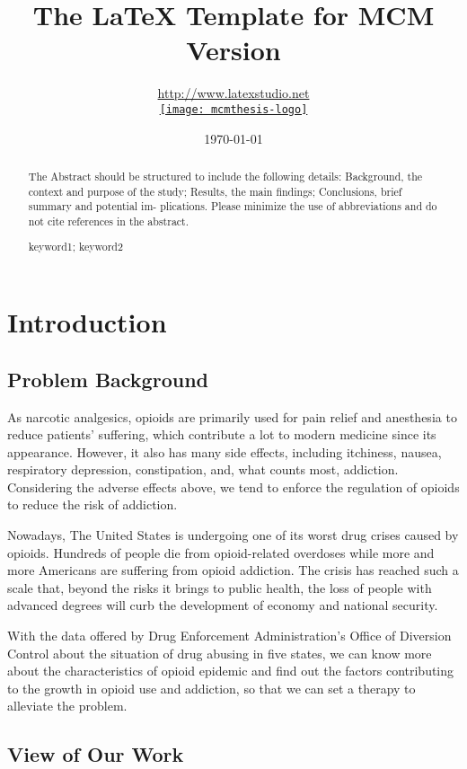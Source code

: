 \documentclass{mcmthesis}
\title{The \LaTeX{} Template for MCM Version \MCMversion}
\author{\url{http://www.latexstudio.net}\\[3pt]  \href{http://www.latexstudio.net/}
  {\texttt{[image: mcmthesis-logo]}}}
\date{\today}
\begin{document}
\begin{abstract}
	The Abstract should be
	structured to include the following details: Background,
	the context and purpose of the study; Results, the main
	findings; Conclusions, brief summary and potential im-
	plications. Please minimize the use of abbreviations and
	do not cite references in the abstract.
	\begin{keywords}
		keyword1; keyword2
	\end{keywords}
\end{abstract}

\maketitle

\tableofcontents
\newpage

\section{Introduction}
	\subsection{Problem Background}
		\par As narcotic analgesics, opioids are primarily used for pain relief and anesthesia to reduce patients' suffering, which contribute a lot to modern medicine since its appearance. However, it also has many side effects, including itchiness, nausea, respiratory depression, constipation, and, what counts most, addiction. Considering the adverse effects above, we tend to enforce the regulation of opioids to reduce the risk of addiction.
		
		Nowadays, The United States is undergoing one of its worst drug crises caused by opioids. Hundreds of people die from opioid-related overdoses while more and more Americans are suffering from opioid addiction. The crisis has reached such a scale that, beyond the risks it brings to public health, the loss of people with advanced degrees will curb the development of economy and national security.
		
		With the data offered by Drug Enforcement Administration's Office of Diversion Control about the situation of drug abusing in five states, we can know more about the characteristics of opioid epidemic and find out the factors contributing to the growth in opioid use and addiction, so that we can set a therapy to alleviate the problem.


	\subsection{View of Our Work}
\end{document}
